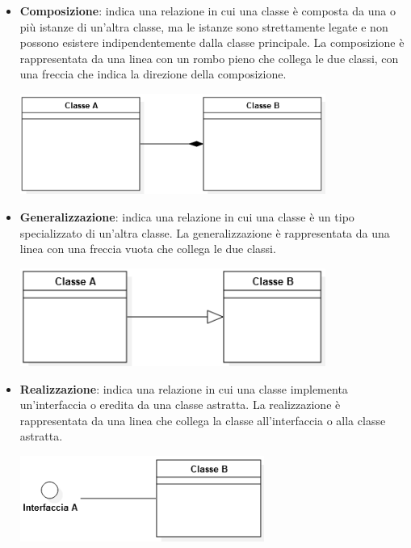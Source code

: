 \begin{itemize}
\begin{center}
	      \end{center}
	\item \textbf{Composizione}: indica una relazione in cui una classe è composta da una o più istanze di un'altra classe, ma le istanze sono strettamente legate e non possono esistere indipendentemente dalla classe principale. La composizione è rappresentata da una linea con un rombo pieno che collega le due classi, con una freccia che indica la direzione della composizione.
	      \begin{center}
		      \includegraphics*[width=10cm]{../../../images/norme_di_progetto/composizioneClassi.png}
	      \end{center}
	\item \textbf{Generalizzazione}: indica una relazione in cui una classe è un tipo specializzato di un'altra classe. La generalizzazione è rappresentata da una linea con una freccia vuota che collega le due classi.
	      \begin{center}
		      \includegraphics*[width=10cm]{../../../images/norme_di_progetto/generalizzazioneClassi.png}
	      \end{center}
	      \newpage
	\item \textbf{Realizzazione}: indica una relazione in cui una classe implementa un'interfaccia o eredita da una classe astratta. La realizzazione è rappresentata da una linea che collega la classe all'interfaccia o alla classe astratta.
	      \begin{center}
		      \includegraphics*[width=8cm]{../../../images/norme_di_progetto/realizzazioneClassi.png}
	      \end{center}
\end{itemize}
